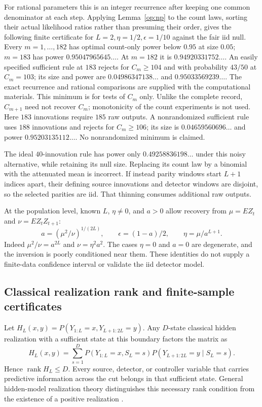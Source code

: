 For rational parameters this is an integer recurrence after keeping one
common denominator at each step.  Applying Lemma~\ref{op:np} to the count
laws, sorting their actual likelihood ratios rather than presuming their
order, gives the following finite certificate for
\(L=2,\eta=1/2,\epsilon=1/10\) against the fair iid null.
Every \(m=1,\ldots,182\) has optimal count-only power below \(0.95\) at
size \(0.05\); \(m=183\) has power \(0.95047965645\ldots\).
At \(m=182\) it is \(0.94920331752\ldots\).
An easily specified sufficient rule at \(183\) rejects for \(C_m\ge104\)
and with probability \(43/50\) at \(C_m=103\); its size and power are
\(0.04986347138\ldots\) and \(0.95033569239\ldots\).
The exact recurrence and rational comparisons are supplied with the
computational materials.  This minimum is for tests of \(C_m\) only.
Unlike the complete record, \(C_{m+1}\) need not recover \(C_m\);
monotonicity of the count experiments is not used.
Here \(183\) innovations require \(185\) raw outputs.
A nonrandomized sufficient rule uses \(188\) innovations and rejects
for \(C_m\ge106\); its size is \(0.04659560696\ldots\) and power
\(0.95203135112\ldots\).  No nonrandomized minimum is claimed.

The ideal \(40\)-innovation rule has power only
\(0.49258836198\ldots\) under this noisy alternative, while retaining its
null size.  Replacing its count law by a binomial with the attenuated
mean is incorrect.  If instead parity windows start \(L+1\) indices
apart, their defining source innovations and detector windows are
disjoint, so the selected parities are iid.  That thinning consumes
additional raw outputs.

At the population level, known \(L\), \(\eta\ne0\), and \(a>0\) allow
recovery from \(\mu=E Z_t\) and \(\nu=E Z_tZ_{t+1}\):
\[
 a=(\mu^2/\nu)^{1/(2L)},\qquad
 \epsilon=(1-a)/2,\qquad \eta=\mu/a^{L+1}.
\]
Indeed \(\mu^2/\nu=a^{2L}\) and \(\nu=\eta^2a^2\).
The cases \(\eta=0\) and \(a=0\) are degenerate, and the inversion is
poorly conditioned near them.  These identities do not supply a
finite-data confidence interval or validate the iid detector model.

\subsection{Classical realization rank and finite-sample certificates}
\label{op:rank}

Let \(H_L(x,y)=P(Y_{1:L}=x,Y_{L+1:2L}=y)\).
Any \(D\)-state classical hidden realization with a sufficient state at
this boundary factors the matrix as
\[
 H_L(x,y)=\sum_{s=1}^D P(Y_{1:L}=x,S_L=s)
                    P(Y_{L+1:2L}=y\mid S_L=s).
\]
Hence \(\operatorname{rank}H_L\le D\).
Every source, detector, or controller variable that carries predictive
information across the cut belongs in that sufficient state.  General
hidden-model realization theory distinguishes this necessary rank
condition from the existence of a positive realization
\cite{op:ohta,op:vanluyten}.

